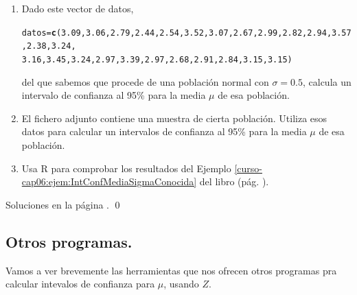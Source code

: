 \documentclass[10pt,a4paper]{article}\usepackage[]{graphicx}\usepackage[]{color}
\makeatletter
\newcommand{\hlnum}[1]{\textcolor[rgb]{0.686,0.059,0.569}{#1}}%
\newcommand{\hlstd}[1]{\textcolor[rgb]{0.345,0.345,0.345}{#1}}%
\newcommand{\hlkwb}[1]{\textcolor[rgb]{0.69,0.353,0.396}{#1}}%
\newcommand{\hlkwd}[1]{\textcolor[rgb]{0.737,0.353,0.396}{\textbf{#1}}}%
\newenvironment{kframe}{%
 \def\at@end@of@kframe{}%
 \ifinner\ifhmode%
  \def\at@end@of@kframe{\end{minipage}}%
  \begin{minipage}{\columnwidth}%
 \fi\fi%
 \def\FrameCommand##1{\hskip\@totalleftmargin \hskip-\fboxsep
 \colorbox{shadecolor}{##1}\hskip-\fboxsep
     \hskip-\linewidth \hskip-\@totalleftmargin \hskip\columnwidth}%
 \MakeFramed {\advance\hsize-\width
   \@totalleftmargin\z@ \linewidth\hsize
   \@setminipage}}%
 {\par\unskip\endMakeFramed%
 \at@end@of@kframe}
\newenvironment{knitrout}{}{} %
\newcounter {cont01}
\makeatother
\begin{document}
\begin{ejercicio}
\begin{enumerate}
  \item Dado este vector de datos,
\begin{knitrout}
\color{fgcolor}\begin{kframe}
\begin{alltt}
\hlstd{datos} \hlkwb{=} \hlkwd{c}\hlstd{(}\hlnum{3.09}\hlstd{,}\hlnum{3.06}\hlstd{,}\hlnum{2.79}\hlstd{,}\hlnum{2.44}\hlstd{,}\hlnum{2.54}\hlstd{,}\hlnum{3.52}\hlstd{,}\hlnum{3.07}\hlstd{,}\hlnum{2.67}\hlstd{,}\hlnum{2.99}\hlstd{,}\hlnum{2.82}\hlstd{,}\hlnum{2.94}\hlstd{,}\hlnum{3.57}\hlstd{,}\hlnum{2.38}\hlstd{,}\hlnum{3.24}\hlstd{,}
\hlnum{3.16}\hlstd{,}\hlnum{3.45}\hlstd{,}\hlnum{3.24}\hlstd{,}\hlnum{2.97}\hlstd{,}\hlnum{3.39}\hlstd{,}\hlnum{2.97}\hlstd{,}\hlnum{2.68}\hlstd{,}\hlnum{2.91}\hlstd{,}\hlnum{2.84}\hlstd{,}\hlnum{3.15}\hlstd{,}\hlnum{3.15}\hlstd{)}
\end{alltt}
\end{kframe}
\end{knitrout}
  del que sabemos que procede de una población normal con $\sigma=0.5$, calcula un intervalo de confianza al 95\% para la media $\mu$ de esa población.

  \item El fichero adjunto  contiene una muestra de cierta población. Utiliza esos datos para calcular un intervalos  de confianza al 95\% para la media $\mu$ de esa población.

  \item Usa R para comprobar los resultados del Ejemplo \ref{curso-cap06:ejem:IntConfMediaSigmaConocida} del libro (pág. \pageref{curso-cap06:ejem:IntConfMediaSigmaConocida}).

\end{enumerate}
Soluciones en la página \pageref{tut06:ejercicio06:sol}.
\qed
\end{ejercicio}

\newpage

\subsection{Otros programas.}
\label{tut06:subsec:IntConfMediaZOtrosProgramas}
Vamos a ver brevemente las herramientas que nos ofrecen otros programas pra calcular intevalos de confianza para $\mu$, usando $Z$.
\end{document}
